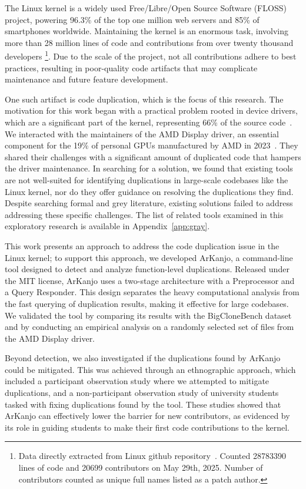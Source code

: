 \en

The Linux kernel is a widely used Free/Libre/Open Source Software (FLOSS) project, 
powering 96.3\% of the top one million web servers and 85\% of smartphones worldwide. 
Maintaining the kernel is an enormous task, involving more than 28 million lines of 
code and contributions from over twenty thousand developers
\footnote{Data directly extracted from Linux github repository~\citep{linuxrepo}.
Counted  28783390 lines of code and 20699 contributors on May 29th, 2025.
Number of contributors counted as unique full names listed as a patch author.}.
Due to the scale of the project, not all contributions adhere to best practices, resulting 
in poor-quality code artifacts that may complicate maintenance and future feature development.

One such artifact is code duplication, which is the focus of this research. The motivation for 
this work began with a practical problem rooted in device drivers, which are a significant part 
of the kernel, representing 66\% of the source code~\citep{marcelo}. We interacted with the 
maintainers of the AMD Display driver, an essential component for the 19\% of personal GPUs 
manufactured by AMD in 2023~\citep{gpumarket}. They shared their challenges with a significant 
amount of duplicated code that hampers the driver maintenance. In searching for a solution, 
we found that existing tools are not well-suited for identifying duplications in large-scale 
codebases like the Linux kernel, nor do they offer guidance on resolving the duplications 
they find. Despite searching formal and grey literature, existing solutions failed to address
addressing these specific challenges. The list of related tools examined in this exploratory 
research is available in Appendix~\ref{app:gray}.

This work presents an approach to address the code duplication issue in the Linux kernel; to 
support this approach, we developed ArKanjo, a command-line tool designed to detect and analyze 
function-level duplications. Released under the MIT license, ArKanjo uses a two-stage 
architecture with a Preprocessor and a Query Responder. This design separates the heavy 
computational analysis from the fast querying of duplication results, making it effective for 
large codebases. We validated the tool by comparing its results with the BigCloneBench
dataset~\citep{bigclonebench} and by conducting an empirical analysis on a randomly selected set of 
files from the AMD Display driver.

Beyond detection, we also investigated if the duplications found by ArKanjo could be mitigated.
This was achieved through an ethnographic approach, which included a participant observation 
study where we attempted to mitigate duplications, and a non-participant observation study of 
university students tasked with fixing duplications found by the tool. These studies showed that 
ArKanjo can effectively lower the barrier for new contributors, as evidenced by its role in 
guiding students to make their first code contributions to the kernel.

